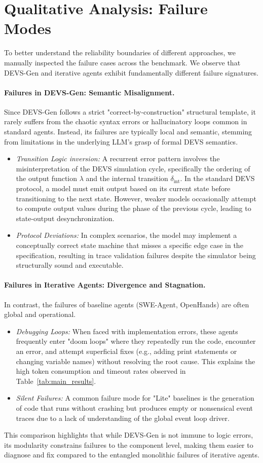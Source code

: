 \section{Qualitative Analysis: Failure Modes}
\label{sec:failure_modes}

To better understand the reliability boundaries of different approaches, we manually inspected the failure cases across the benchmark. We observe that DEVS-Gen and iterative agents exhibit fundamentally different failure signatures.

\paragraph{Failures in DEVS-Gen: Semantic Misalignment.}
Since DEVS-Gen follows a strict "correct-by-construction" structural template, it rarely suffers from the chaotic syntax errors or hallucinatory loops common in standard agents. Instead, its failures are typically local and semantic, stemming from limitations in the underlying LLM's grasp of formal DEVS semantics.
\begin{itemize}[leftmargin=*]
\item \emph{Transition Logic inversion:} A recurrent error pattern involves the misinterpretation of the DEVS simulation cycle, specifically the ordering of the output function $\lambda$ and the internal transition $\delta_{\textrm{int}}$. In the standard DEVS protocol, a model must emit output based on its current state before transitioning to the next state. However, weaker models occasionally attempt to compute output values during the phase of the previous cycle, leading to state-output desynchronization.
\item \emph{Protocol Deviations:} In complex scenarios, the model may implement a conceptually correct state machine that misses a specific edge case in the specification, resulting in trace validation failures despite the simulator being structurally sound and executable.
\end{itemize}

\paragraph{Failures in Iterative Agents: Divergence and Stagnation.}
In contrast, the failures of baseline agents (SWE-Agent, OpenHands) are often global and operational.
\begin{itemize}[leftmargin=*]
\item \emph{Debugging Loops:} When faced with implementation errors, these agents frequently enter "doom loops" where they repeatedly run the code, encounter an error, and attempt superficial fixes (e.g., adding print statements or changing variable names) without resolving the root cause. This explains the high token consumption and timeout rates observed in Table~\ref{tab:main_results}.
\item \emph{Silent Failures:} A common failure mode for "Lite" baselines is the generation of code that runs without crashing but produces empty or nonsensical event traces due to a lack of understanding of the global event loop driver.
\end{itemize}

This comparison highlights that while DEVS-Gen is not immune to logic errors, its modularity constrains failures to the component level, making them easier to diagnose and fix compared to the entangled monolithic failures of iterative agents.